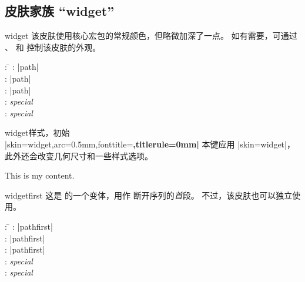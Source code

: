 \clearpage
\subsection{皮肤家族 \enquote{widget}}
\begin{docSkin}{widget}
  该皮肤使用核心宏包的常规颜色，但略微加深了一点。
  如有需要，可通过 、
   和 
  控制该皮肤的外观。
\begin{tcolorbox}[skintable=widget]
  \begin{tabbing}
    : \=\kill
    :           \> |path|\\
    : \> |path|\\ 
    :        \> |path|\\
    :    \> \emph{special}\\
    :           \> \emph{special}
  \end{tabbing}
\end{tcolorbox}
\end{docSkin}


\begin{docTcbKey}[][doc updated={2020-09-23}]{widget}{}{样式，初始\\
  |skin=widget,arc=0.5mm,fonttitle=\bfseries,titlerule=0mm|
}
  本键应用 |skin=widget|，此外还会改变几何尺寸和一些样式选项。
\end{docTcbKey}


\begin{dispExample}
\end{dispExample}


\begin{dispExample}
\begin{tcolorbox}[widget,colback=Salmon!50!white,colframe=FireBrick!75!black,
  adjusted title=A colored box with the \enquote{widget} skin]
This is my content.
\end{tcolorbox}
\end{dispExample}

\clearpage

\begin{docSkin}{widgetfirst}
这是  的一个变体，用作  断开序列的\emph{首}段。
不过，该皮肤也可以独立使用。
\begin{tcolorbox}[skintable=widgetfirst]
  \begin{tabbing}
    : \=\kill
    :           \> |pathfirst|\\
    : \> |pathfirst|\\ 
    :        \> |pathfirst|\\
    :    \> \emph{special}\\
    :           \> \emph{special}
  \end{tabbing}
\end{tcolorbox}
\end{docSkin}


